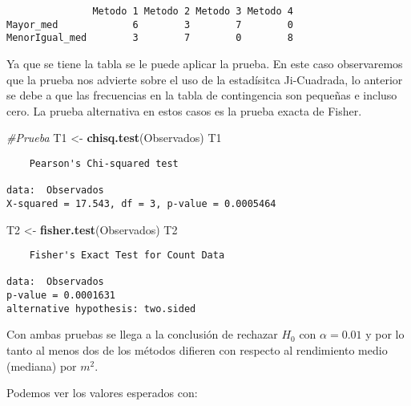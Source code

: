 \documentclass[
  a4paper,
  oneside,
  openany]{book}
\newenvironment{Shaded}{\begin{snugshade}}{\end{snugshade}}
\newcommand{\CommentTok}[1]{\textcolor[rgb]{0.56,0.35,0.01}{\textit{#1}}}
\newcommand{\KeywordTok}[1]{\textcolor[rgb]{0.13,0.29,0.53}{\textbf{#1}}}
\newcommand{\NormalTok}[1]{#1}
\newcommand{\OperatorTok}[1]{\textcolor[rgb]{0.81,0.36,0.00}{\textbf{#1}}}
\newcommand{\StringTok}[1]{\textcolor[rgb]{0.31,0.60,0.02}{#1}}
\begin{document}
\begin{verbatim}
               Metodo 1 Metodo 2 Metodo 3 Metodo 4
Mayor_med             6        3        7        0
MenorIgual_med        3        7        0        8
\end{verbatim}

Ya que se tiene la tabla se le puede aplicar la prueba. En este caso observaremos que la prueba nos advierte sobre el uso de la estadísitca Ji-Cuadrada, lo anterior se debe a que las frecuencias en la tabla de contingencia son pequeñas e incluso cero. La prueba alternativa en estos casos es la prueba exacta de Fisher.

\begin{Shaded}
\begin{Highlighting}[]
\CommentTok{\#Prueba}
\NormalTok{T1 \textless{}{-}}\StringTok{ }\KeywordTok{chisq.test}\NormalTok{(Observados)}
\NormalTok{T1}
\end{Highlighting}
\end{Shaded}

\begin{verbatim}
    Pearson's Chi-squared test

data:  Observados
X-squared = 17.543, df = 3, p-value = 0.0005464
\end{verbatim}

\begin{Shaded}
\begin{Highlighting}[]
\NormalTok{T2 \textless{}{-}}\StringTok{ }\KeywordTok{fisher.test}\NormalTok{(Observados)}
\NormalTok{T2}
\end{Highlighting}
\end{Shaded}

\begin{verbatim}
    Fisher's Exact Test for Count Data

data:  Observados
p-value = 0.0001631
alternative hypothesis: two.sided
\end{verbatim}

Con ambas pruebas se llega a la conclusión de rechazar \(H_0\) con \(\alpha=0.01\) y por lo tanto al menos dos de los métodos difieren con respecto al rendimiento medio (mediana) por \(m^2\).

Podemos ver los valores esperados con:

\begin{Shaded}
\end{Shaded}
\end{document}
